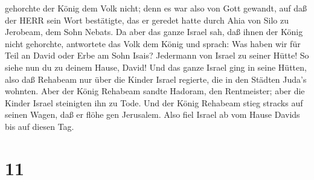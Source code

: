 gehorchte der König dem Volk nicht; denn es war also von Gott gewandt,
auf daß der HERR sein Wort bestätigte, das er geredet hatte durch Ahia
von Silo zu Jerobeam, dem Sohn Nebats.  Da aber das ganze
Israel sah, daß ihnen der König nicht gehorchte, antwortete das Volk dem
König und sprach: Was haben wir für Teil an David oder Erbe am Sohn
Isais? Jedermann von Israel zu seiner Hütte! So siehe nun du zu deinem
Hause, David! Und das ganze Israel ging in seine Hütten, 
also daß Rehabeam nur über die Kinder Israel regierte, die in den
Städten Juda's wohnten.  Aber der König Rehabeam sandte
Hadoram, den Rentmeister; aber die Kinder Israel steinigten ihn zu Tode.
Und der König Rehabeam stieg stracks auf seinen Wagen, daß er flöhe gen
Jerusalem.  Also fiel Israel ab vom Hause Davids bis auf
diesen Tag.

\hypertarget{section-10}{%
\section{11}\label{section-10}}

